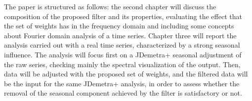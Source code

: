 \documentclass{article}
\begin{document}
The paper is structured as follows: the second chapter will discuss the composition of the proposed filter and its properties, evaluating the effect that the set of weights has in the frequency domain and including some concepts about Fourier domain analysis of a time series. Chapter three will report the analysis carried out with a real time series, characterized by a strong seasonal influence. The analysis will focus first on a JDemetra+ seasonal adjustment of the raw series, checking mainly the spectral visualization of the output. Then, data will be adjusted with the proposed set of weights, and the filtered data will be the input for the same JDemetra+ analysis, in order to assess whether the removal of the seasonal component achieved by the filter is satisfactory or not.\\
\end{document}
